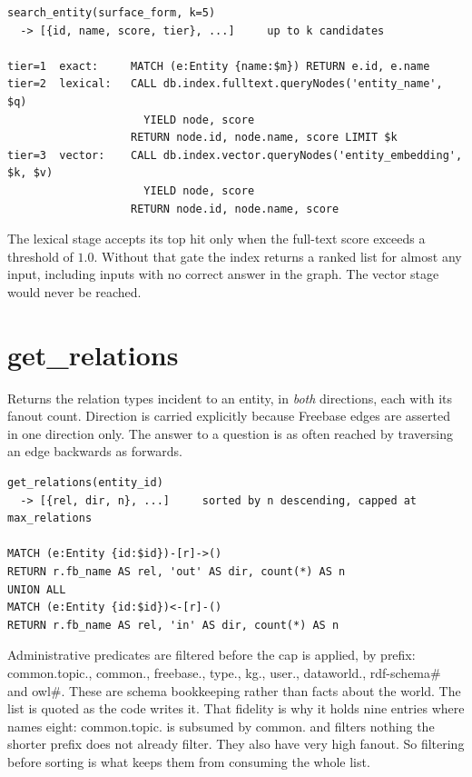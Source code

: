 \begin{lstlisting}[style=verbatimblock]
search_entity(surface_form, k=5)
  -> [{id, name, score, tier}, ...]     up to k candidates

tier=1  exact:     MATCH (e:Entity {name:$m}) RETURN e.id, e.name
tier=2  lexical:   CALL db.index.fulltext.queryNodes('entity_name', $q)
                     YIELD node, score
                   RETURN node.id, node.name, score LIMIT $k
tier=3  vector:    CALL db.index.vector.queryNodes('entity_embedding', $k, $v)
                     YIELD node, score
                   RETURN node.id, node.name, score
\end{lstlisting}

The lexical stage accepts its top hit only when the full-text score exceeds a
threshold of $1.0$. Without that gate the index returns a ranked list for almost
any input, including inputs with no correct answer in the graph. The vector
stage would never be reached.

\section{get\_relations}\label{app:tool-relations}

Returns the relation types incident to an entity, in \emph{both} directions,
each with its fanout count. Direction is carried explicitly because Freebase
edges are asserted in one direction only. The answer to a question is as
often reached by traversing an edge backwards as forwards.

\begin{lstlisting}[style=verbatimblock]
get_relations(entity_id)
  -> [{rel, dir, n}, ...]     sorted by n descending, capped at max_relations

MATCH (e:Entity {id:$id})-[r]->()
RETURN r.fb_name AS rel, 'out' AS dir, count(*) AS n
UNION ALL
MATCH (e:Entity {id:$id})<-[r]-()
RETURN r.fb_name AS rel, 'in' AS dir, count(*) AS n
\end{lstlisting}

Administrative predicates are filtered before the cap is applied, by prefix:
\textsf{common.topic.}, \textsf{common.}, \textsf{freebase.}, \textsf{type.},
\textsf{kg.}, \textsf{user.}, \textsf{dataworld.}, \textsf{rdf-schema\#} and
\textsf{owl\#}. These are schema bookkeeping rather than facts about the world.
The list is quoted as the code writes it. That fidelity is why it holds nine
entries where  names eight: \textsf{common.topic.} is
subsumed by \textsf{common.} and filters nothing the shorter prefix does not
already filter. They also have very high fanout. So filtering before sorting
is what keeps them from consuming the whole list.

